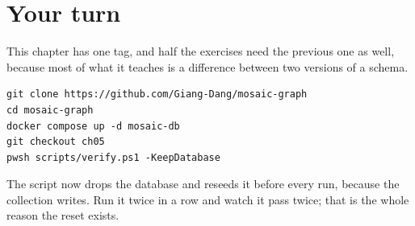 \section*{Your turn}

This chapter has one tag, and half the exercises need the previous one as well,
because most of what it teaches is a difference between two versions of a
schema.

\begin{verbatim}
git clone https://github.com/Giang-Dang/mosaic-graph
cd mosaic-graph
docker compose up -d mosaic-db
git checkout ch05
pwsh scripts/verify.ps1 -KeepDatabase
\end{verbatim}

The script now drops the database and reseeds it before every run, because the
collection writes. Run it twice in a row and watch it pass twice; that is the
whole reason the reset exists.

